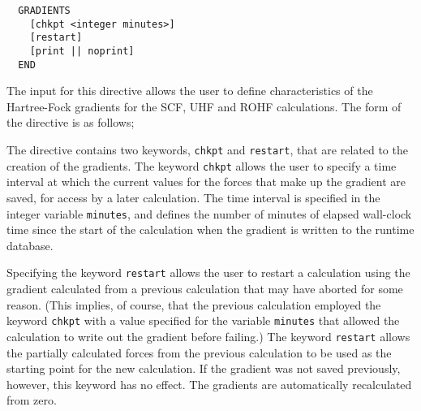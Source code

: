 \label{sec:scfgrad}

\begin{verbatim}
  GRADIENTS 
    [chkpt <integer minutes>]
    [restart]
    [print || noprint]
  END
\end{verbatim}


The input for this directive allows the user to define 
characteristics of the Hartree-Fock gradients for the SCF, UHF and ROHF
calculations.  The form of the directive is as follows;



The directive contains two keywords, \verb+chkpt+ and \verb+restart+,
that are related to the creation of the gradients.  The keyword \verb+chkpt+
allows the user to specify a time interval at which the current values
for the forces that make up 
the gradient are saved, for access by a later calculation.  The time
interval is specified in the integer variable \verb+minutes+, and defines
the number of minutes of elapsed wall-clock time since the start of the
calculation when the gradient is written to the runtime database.




Specifying the keyword \verb+restart+ allows the user to restart a calculation
using the gradient calculated from a previous calculation that may have
aborted for some reason.  (This implies, of course, that the previous
calculation employed the keyword \verb+chkpt+ with a value specified for
the variable \verb+minutes+ that allowed the calculation to write out the
gradient before failing.)  The keyword \verb+restart+ allows the partially
calculated forces from the previous calculation to be used as the starting
point for the new calculation.  If the gradient was not saved previously,
however, this keyword has no effect.  The gradients are automatically 
recalculated from zero.

